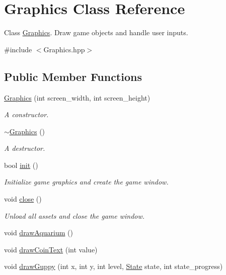 \hypertarget{class_graphics}{}\section{Graphics Class Reference}
\label{class_graphics}


Class \mbox{\hyperlink{class_graphics}{Graphics}}. Draw game objects and handle user inputs.  




{\ttfamily \#include $<$Graphics.\+hpp$>$}

\subsection*{Public Member Functions}
\begin{DoxyCompactItemize}
\item 
\mbox{\hyperlink{class_graphics_ad02d1ced072b77d6177cb2ec6ea5b7df}{Graphics}} (int screen\+\_\+width, int screen\+\_\+height)
\begin{DoxyCompactList}\small\item\em A constructor. \end{DoxyCompactList}\item 
\mbox{\hyperlink{class_graphics_a7841c9a961ac9bca33bd30ddf8066cdb}{$\sim$\+Graphics}} ()
\begin{DoxyCompactList}\small\item\em A destructor. \end{DoxyCompactList}\item 
bool \mbox{\hyperlink{class_graphics_a64b5764b2dbef1b6df23ce18b1a918a1}{init}} ()
\begin{DoxyCompactList}\small\item\em Initialize game graphics and create the game window. \end{DoxyCompactList}\item 
void \mbox{\hyperlink{class_graphics_a5285ec6ed237f24f7d7cf2423886a0cc}{close}} ()
\begin{DoxyCompactList}\small\item\em Unload all assets and close the game window. \end{DoxyCompactList}\item 
void \mbox{\hyperlink{class_graphics_a5f3a657a7c54f13108bd90e6a85bd02e}{draw\+Aquarium}} ()
\item 
void \mbox{\hyperlink{class_graphics_adaecfa8fab0e04636cb575d7599494d6}{draw\+Coin\+Text}} (int value)
\item 
void \mbox{\hyperlink{class_graphics_a35aa55c180a9f9be306b74906f710954}{draw\+Guppy}} (int x, int y, int level, \mbox{\hyperlink{_constants_8hpp_a5d74787dedbc4e11c1ab15bf487e61f8}{State}} state, int state\+\_\+progress)

\end{DoxyCompactItemize}
